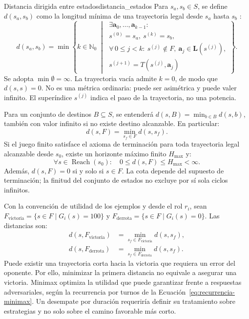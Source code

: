 \begin{definicion}{Distancia dirigida entre estados}{distancia_estados}
Para $s_a,s_b\in S$, se define $d(s_a,s_b)$ como la longitud mínima de una trayectoria legal desde $s_a$ hasta $s_b$ \cite{BonetGeffner2001, RussellNorvig2010}:
\begin{equation}
    d(s_a,s_b)=\min\left\{k\in\mathbb N_0\;\middle|\;
    \begin{array}{l}
    \exists\mathbf a_0,\ldots,\mathbf a_{k-1}:\\
    s^{(0)}=s_a,\ s^{(k)}=s_b,\\
    \forall\,0\le j<k:\ s^{(j)}\notin F,\ \mathbf a_j\in\mathbf L(s^{(j)}),\\
    s^{(j+1)}=T(s^{(j)},\mathbf a_j)
    \end{array}\right\}.
    \label{eq:distancia-dirigida}
\end{equation}
Se adopta $\min\emptyset=\infty$. La trayectoria vacía admite $k=0$, de modo que $d(s,s)=0$. No es una métrica ordinaria: puede ser asimétrica y puede valer infinito. El superíndice $s^{(j)}$ indica el paso de la trayectoria, no una potencia.
\end{definicion}

Para un conjunto de destinos $B\subseteq S$, se entenderá $d(s,B)=\min_{b\in B}d(s,b)$, también con valor infinito si no existe destino alcanzable. En particular:
\begin{equation}
    d(s,F)=\min_{s_f\in F}d(s,s_f).
    \label{eq:distancia-terminal}
\end{equation}
Si el juego finito satisface el axioma de terminación para toda trayectoria legal alcanzable desde $s_0$, existe un horizonte máximo finito $H_{\max}$ y:
\begin{equation}
    \forall s\in\operatorname{Reach}(s_0):\quad 0\le d(s,F)\le H_{\max}<\infty.
    \label{eq:cota-horizonte}
\end{equation}
Además, $d(s,F)=0$ si y solo si $s\in F$. La cota depende del supuesto de terminación; la finitud del conjunto de estados no excluye por sí sola ciclos infinitos.

Con la convención de utilidad de los ejemplos y desde el rol $r_i$, sean $F_{\text{victoria}}=\{s\in F\mid G_i(s)=100\}$ y $F_{\text{derrota}}=\{s\in F\mid G_i(s)=0\}$. Las distancias son:
\begin{align}
    d(s,F_{\text{victoria}})&=\min_{s_f\in F_{\text{victoria}}}d(s,s_f),\label{eq:distancia-victoria}\\
    d(s,F_{\text{derrota}})&=\min_{s_f\in F_{\text{derrota}}}d(s,s_f).\label{eq:distancia-derrota}
\end{align}
Puede existir una trayectoria corta hacia la victoria que requiera un error del oponente. Por ello, minimizar la primera distancia no equivale a asegurar una victoria. Minimax optimiza la utilidad que puede garantizar frente a respuestas adversariales, según la recurrencia por turnos de la Ecuación~\eqref{eq:recurrencia-minimax}. Un desempate por duración requeriría definir su tratamiento sobre estrategias y no solo sobre el camino favorable más corto.

